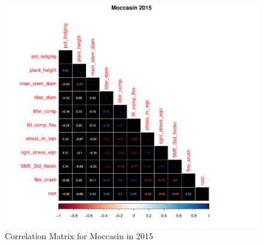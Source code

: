\documentclass[11pt]{article}\usepackage[]{graphicx}\usepackage[]{color}
\makeatletter
\def\maxwidth{ %
  \ifdim\Gin@nat@width>\linewidth
    \linewidth
  \else
    \Gin@nat@width
  \fi
}
\newenvironment{knitrout}{}{} %
\makeatother
\begin{document}
\begin{knitrout}\footnotesize
{}\color{fgcolor}\begin{figure}[H]

{\centering \includegraphics[width=\maxwidth]{figure/Moc15-1} 

}

\caption[Correlation Matrix for Moccasin in 2015]{Correlation Matrix for Moccasin in 2015}\label{fig:Moc15}
\end{figure}


\end{knitrout}
\end{document}
